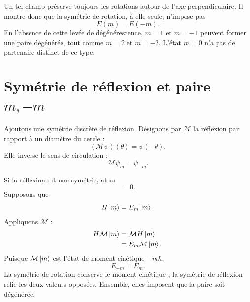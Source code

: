 Un tel champ préserve toujours les rotations autour de l’axe perpendiculaire. Il montre donc que la symétrie de rotation, à elle seule, n’impose pas
\begin{equation}
E(m)=E(-m).
\end{equation}
En l’absence de cette levée de dégénérescence, \(m=1\) et \(m=-1\) peuvent former une paire dégénérée, tout comme \(m=2\) et \(m=-2\). L’état \(m=0\) n’a pas de partenaire distinct de ce type.

\section{Symétrie de réflexion et paire \texorpdfstring{\(m,-m\)}{m, -m}}

Ajoutons une symétrie discrète de réflexion. Désignons par \(\mathcal M\) la réflexion par rapport à un diamètre du cercle :
\begin{equation}
(\mathcal M\psi)(\theta)=\psi(-\theta).
\end{equation}
Elle inverse le sens de circulation :
\begin{equation}
\mathcal M\psi_m=\psi_{-m}.
\end{equation}

Si la réflexion est une symétrie, alors
\begin{equation}
[\mathcal M,H]=0.
\end{equation}
Supposons que
\begin{equation}
H\left\lvert m\right\rangle=E_m\left\lvert m\right\rangle.
\end{equation}
Appliquons \(\mathcal M\) :
\begin{align}
H\mathcal M\left\lvert m\right\rangle
&=\mathcal M H\left\lvert m\right\rangle\\
&=E_m\mathcal M\left\lvert m\right\rangle.
\end{align}
Puisque \(\mathcal M\left\lvert m\right\rangle\) est l’état de moment cinétique \(-m\hbar\),
\begin{equation}
E_{-m}=E_m.
\end{equation}
La symétrie de rotation conserve le moment cinétique ; la symétrie de réflexion relie les deux valeurs opposées. Ensemble, elles imposent que la paire soit dégénérée.

\begin{classroomqa}
\end{classroomqa}

